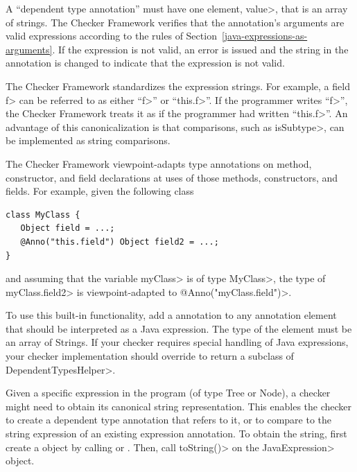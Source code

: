 A ``dependent type annotation''
must have one element, \<value>, that is an
array of strings.  The Checker Framework verifies that the annotation's
arguments are valid expressions according to the rules of
Section~\ref{java-expressions-as-arguments}.  If
the expression is not valid, an error is issued and the string in the
annotation is changed to indicate that the expression is not valid.

The Checker Framework standardizes the expression strings.  For example, a
field \<f> can be referred to as either ``\<f>'' or ``\<this.f>''.  If the
programmer writes ``\<f>'', the Checker Framework treats it
as if the programmer had written ``\<this.f>''.
An advantage of this canonicalization is
that comparisons, such as \<isSubtype>, can be implemented as string comparisons.

The Checker Framework viewpoint-adapts type annotations on method, constructor,
and field declarations at uses of those methods, constructors, and fields.  For example, given the
following class

\begin{Verbatim}
class MyClass {
   Object field = ...;
   @Anno("this.field") Object field2 = ...;
}
\end{Verbatim}
and assuming that the variable \<myClass> is of type \<MyClass>, the type of
\<myClass.field2> is viewpoint-adapted to \<@Anno("myClass.field")>.

To use this built-in functionality, add a  annotation
to any annotation element that should be interpreted as a Java expression.  The type of the
element must be an array of Strings.  If your checker requires special handling of Java expressions,
your checker implementation should override
to return a subclass of \<DependentTypesHelper>.

Given a specific expression in the program (of type Tree or Node), a
checker might need to obtain its canonical string representation.  This
enables the checker to create a dependent type annotation that refers to
it, or to compare to the string expression of an existing expression
annotation.
To obtain the string, first create a
 object by calling
 or
.
Then, call \<toString()> on the \<JavaExpression> object.


